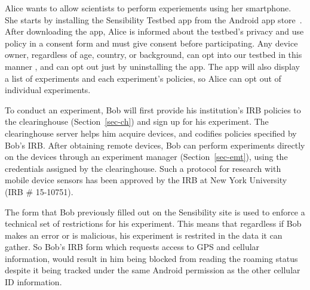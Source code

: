 Alice wants to allow scientists to perform experiements using her smartphone.
She starts by installing the Sensibility Testbed app from 
the Android app store~\cite{sensibility-app}. After downloading the app, 
Alice is informed about the testbed's privacy and use policy 
in a consent form and must give consent before participating.
Any device owner, regardless of age, country, or background, can 
opt into our testbed in this manner , and can opt out just by 
uninstalling the app. The app will also display a list of experiments and 
each experiment's policies, so Alice can opt out of individual experiments. 

To conduct an experiment, Bob will first provide his institution's 
IRB policies  
to the clearinghouse (Section~\ref{sec-ch}) and sign up for his experiment. 
The clearinghouse server helps him acquire devices, and codifies 
policies specified by Bob's IRB. After obtaining remote devices, 
Bob can perform experiments directly on the devices through 
an experiment manager (Section~\ref{sec-emt}),  using the 
credentials assigned by the clearinghouse. Such a 
protocol for research with mobile device sensors has been approved by
the IRB at New York University (IRB \# 15-10751).  

The form that Bob previously filled out on the Sensibility site is used to
enforce a technical set of restrictions for his experiment.  This means
that regardless if Bob makes an error or is malicious, his experiment is
restrited in the data it can gather.  So Bob's IRB form which requests 
access to GPS and cellular information, would result in him being blocked
from reading the roaming status despite it being tracked under the same
Android permission as the other cellular ID information.  


